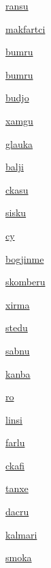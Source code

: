 {\hyperlink{val:ransu}{ransu}}{}{}{}

{\hyperlink{val:makfartci}{makfartci}}{}{}{}

{\hyperlink{val:bumru}{bumru}}{}{}{}

{\hyperlink{val:bumru}{bumru}}{}{}{}

{\hyperlink{val:budjo}{budjo}}{}{}{}

{\hyperlink{val:xamgu}{xamgu}}{}{}{}

{\hyperlink{val:glauka}{glauka}}{}{}{}

{\hyperlink{val:balji}{balji}}{}{}{}

{\hyperlink{val:ckasu}{ckasu}}{}{}{}

{\hyperlink{val:sisku}{sisku}}{}{}{}

{\hyperlink{val:cy}{cy}}{}{}{}

{\hyperlink{val:bogjinme}{bogjinme}}{}{}{}

{\hyperlink{val:skomberu}{skomberu}}{}{}{}

{\hyperlink{val:xirma}{xirma}}{}{}{}

{\hyperlink{val:stedu}{stedu}}{}{}{}

{\hyperlink{val:sabnu}{sabnu}}{}{}{}

{\hyperlink{val:kanba}{kanba}}{}{}{}

{\hyperlink{val:ro}{ro}}{}{}{}

{\hyperlink{val:linsi}{linsi}}{}{}{}

{\hyperlink{val:farlu}{farlu}}{}{}{}

{\hyperlink{val:ckafi}{ckafi}}{}{}{}

{\hyperlink{val:tanxe}{tanxe}}{}{}{}

{\hyperlink{val:dacru}{dacru}}{}{}{}

{\hyperlink{val:kalmari}{kalmari}}{}{}{}

{\hyperlink{val:smoka}{smoka}}{}{}{}

